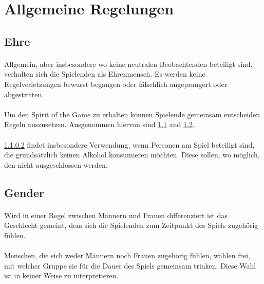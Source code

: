 \section{Allgemeine Regelungen}\label{Allgemeine_Regelungen}

\subsection{Ehre}\label{Allgemeine_Regelungen:Ehre}
\paragraph{} Allgemein, aber insbesondere wo keine neutralen Beobachtenden beteiligt sind, verhalten sich die Spielenden als Ehrenmensch.
Es werden keine Regelverletzungen bewusst begangen oder fälschlich angeprangert oder abgestritten.

\paragraph{}\label{Allgemeine_Regelungen:Ehre:Spirit}
Um den \glqq Spirit of the Game\grqq{} zu erhalten können Spielende gemeinsam entscheiden Regeln auszusetzen.
Ausgenommen hiervon sind \ref{Allgemeine_Regelungen:Ehre} and \ref{Allgemeine_Regelungen:Gender}.

\paragraph{}
\ref{Allgemeine_Regelungen:Ehre:Spirit} findet insbesondere Verwendung, wenn Personen am Spiel beteiligt sind, die grundsätzlich keinen Alkohol konsumieren möchten.
Diese sollen, wo möglich, den nicht ausgeschlossen werden.


\subsection{Gender}\label{Allgemeine_Regelungen:Gender}
\paragraph{}
Wird in einer Regel zwischen Männern und Frauen differenziert ist das Geschlecht gemeint, dem sich die Spielenden zum Zeitpunkt des Spiels zugehörig fühlen.

\paragraph{}
Menschen, die sich weder Männern noch Frauen zugehörig fühlen, wählen frei, mit welcher Gruppe sie für die Dauer des Spiels gemeinsam trinken.
Diese Wahl ist in keiner Weise zu interpretieren.


